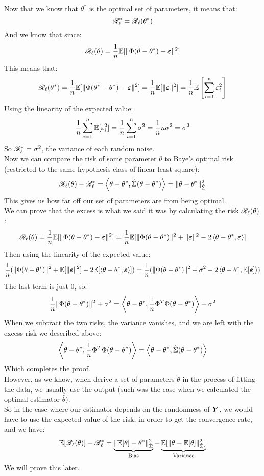 \documentclass[12pt]{article}
\begin{document}
Now that we know that $\theta^*$ is the
optimal set of parameters, it means that:
\[ \mathscr{R}_{\ell}^* = \mathscr{R}_{\ell}(\theta^*) \]
And we know that since:
\[ \mathscr{R}_{\ell}{}(\theta) =
\dfrac{1}{n}\mathbb{E}[\|\Phi (\theta - \theta^*) 
- \boldsymbol{\varepsilon} \|^2] \]
This means that:
\[ \mathscr{R}_{\ell}{}(\theta^*) =
\dfrac{1}{n}\mathbb{E}[\|\Phi (\theta^* - \theta^*) 
- \boldsymbol{\varepsilon} \|^2] = \dfrac{1}{n}\mathbb{E}[\|\boldsymbol{\varepsilon}\|^2]
= \dfrac{1}{n}\mathbb{E}\left[ \sum_{i=1}^{n}\varepsilon_i^2 \right] \]
Using the linearity of the expected value:
\[ \dfrac{1}{n}\sum_{i=1}^{n} \mathbb{E}[\varepsilon_i^2]
= \dfrac{1}{n}\sum_{i=1}^{n} \sigma^2
= \dfrac{1}{n} n\sigma^2 = \sigma^2 \]
So $\mathscr{R}_{\ell}^* = \sigma^2$,
the variance of each random noise. \\

Now we can compare
the risk of some parameter $\theta$
to Baye's optimal risk (restricted
to the same hypothesis class of
linear least square):
\[ \mathscr{R}_{\ell}(\theta) - \mathscr{R}_{\ell}^*
= \left\langle \theta - \theta^*, 
\hat{\Sigma}(\theta - \theta^*)  \right\rangle
= \|\theta - \theta^* \|_{\hat{\Sigma}}^2 \]
This gives us how far off our set
of parameters are from being optimal. \\

We can prove that the excess is
what we said it was by calculating
the risk $\mathscr{R}_{\ell}(\theta)$:
\[ \mathscr{R}_{\ell}(\theta) =
\dfrac{1}{n}\mathbb{E}[\|\Phi (\theta - \theta^*) 
- \boldsymbol{\varepsilon} \|^2]
= \dfrac{1}{n}\mathbb{E}[\|\Phi (\theta - \theta^*) \|^2
+ \|\boldsymbol{\varepsilon} \|^2 
- 2\left\langle \theta - \theta^*, \boldsymbol{\varepsilon} \right\rangle] \]
Then using the linearity of the expected value:
\[ \dfrac{1}{n} (\|\Phi (\theta - \theta^*) \|^2
+ \mathbb{E}[\|\boldsymbol{\varepsilon} \|^2 ]
- 2\mathbb{E}[\left\langle \theta - \theta^*, \boldsymbol{\varepsilon} \right\rangle])
= \dfrac{1}{n} (\|\Phi (\theta - \theta^*) \|^2
+ \sigma^2 - 
2\left\langle \theta - \theta^*, \mathbb{E}[\boldsymbol{\varepsilon}] \right\rangle) \]
The last term is just $0$, so:
\[ \dfrac{1}{n} \|\Phi (\theta - \theta^*) \|^2
+ \sigma^2
= \left\langle \theta - \theta^*,
\dfrac{1}{n}\Phi^T\Phi(\theta - \theta^*) \right\rangle
+ \sigma^2 \]
When we subtract the two risks,
the variance vanishes, and we are left
with the excess risk we described above:
\[ \left\langle \theta - \theta^*,
\dfrac{1}{n}\Phi^T\Phi(\theta - \theta^*) \right\rangle
= \left\langle \theta - \theta^*,
\hat{\Sigma}(\theta - \theta^*) \right\rangle \]
Which completes the proof. \\

However, as we know, when derive a set
of parameters $\tilde{\theta}$ in the process
of fitting the data, we usually use the output
(such was the case when we calculated the
optimal estimator $\hat{\theta}$). \\
So in the case where our estimator depends
on the randomness of $\boldsymbol{Y}$,
we would have to use the expected value
of the risk, in order to get the convergence
rate, and we have:
\[ \mathbb{E}[\mathscr{R}_{\ell}(\tilde{\theta})] 
- \mathscr{R}_{\ell}^* = \underbrace{
\| \mathbb{E}[\tilde{\theta}] - \theta^*
\|^2_{\hat{\Sigma}}}_{\text{Bias}}
+ \underbrace{
\mathbb{E}[\|\tilde{\theta} - \mathbb{E}[\tilde{\theta}] 
\|^2_{\hat{\Sigma}}]}_{\text{Variance}} \]
We will prove this later. \\
\end{document}
